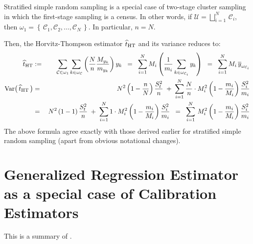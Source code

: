 \documentclass{article}
\begin{document}
Stratified simple random sampling is a special case of two-stage cluster sampling in which the first-stage sampling is a census.  In other words, if $\mathcal{U} = \displaystyle{\bigsqcup_{i=1}^{N}}\,\mathcal{C}_{i}$, then $\omega_{1} = \left\{\,\mathcal{C}_{1},\mathcal{C}_{2},\ldots,\mathcal{C}_{N}\,\right\}$.  In particular, $n = N$.

Then, the Horvitz-Thompson estimator $\widehat{t}_{\textnormal{HT}}$ and its variance reduces to:
\begin{eqnarray*}
\widehat{t}_{\textnormal{HT}}
& := & \sum_{\mathcal{C}\in\omega_{1}} \sum_{k\in\omega_{\mathcal{C}}}\left(\dfrac{N}{n}\dfrac{M_{y_{k}}}{m_{y_{k}}}\right)y_{k}
\;\;=\;\;  \sum_{i=1}^{N} M_{i}\left(\dfrac{1}{m_{i}} \sum_{k\in\omega_{\mathcal{C}_{i}}}y_{k}\right) 
\;\;=\;\;  \sum_{i=1}^{N} M_{i}\,\overline{y}_{\omega_{\mathcal{C}_{i}}}
\\
\textnormal{Var}\!\left(\,\widehat{t}_{\textnormal{HT}}\,\right)
& = &
N^{2}\left(1-\dfrac{n}{N}\right)\dfrac{S^{2}_{t}}{n} \; + \; 
\sum^{N}_{i=1}\dfrac{N}{n}\cdot M_{i}^{2}\left(1-\dfrac{m_{i}}{M_{i}}\right)\dfrac{S^{2}_{i}}{m_{i}} \\
& = &
N^{2}\left(1-1\right)\dfrac{S^{2}_{t}}{n} \; + \; 
\sum^{N}_{i=1}1\cdot M_{i}^{2}\left(1-\dfrac{m_{i}}{M_{i}}\right)\dfrac{S^{2}_{i}}{m_{i}}
\;\;=\;\;
\sum^{N}_{i=1}\,M_{i}^{2}\left(1-\dfrac{m_{i}}{M_{i}}\right)\dfrac{S^{2}_{i}}{m_{i}}
\end{eqnarray*}
The above formula agree exactly with those derived earlier for stratified simple random sampling (apart from obvious notational changes).


\section{Generalized Regression Estimator as a special case of Calibration Estimators}
\setcounter{theorem}{0}

This is a summary of \cite{DevilleSarndal1992}.
\end{document}

